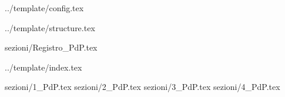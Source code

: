  {../template/config.tex}


\def\DOCUMENTO{Piano di Progetto}
\def\VERSIONE{0.0.1}

\def\DESCRIZIONE{<Info documento>}

\def\REDATTORE {<Redattore>}
\def\VERIFICATORE {<Verificatore>}
\def\RESPONSABILE {<Responsabile>}

\def\USO {<Uso>}

\def\DISTRIBUZIONE {\GRUPPO{}\\ & \COMMITTENTE{}\\}

\def\DESCRIZIONE {<descrizione>}


\def\INDICE	{true}
\def\TABELLE {true}
\def\FIGURE {false}


 {../template/structure.tex}

 {sezioni/Registro_PdP.tex}

 {../template/index.tex}


 {sezioni/1_PdP.tex}
 {sezioni/2_PdP.tex}
 {sezioni/3_PdP.tex}
 {sezioni/4_PdP.tex}






